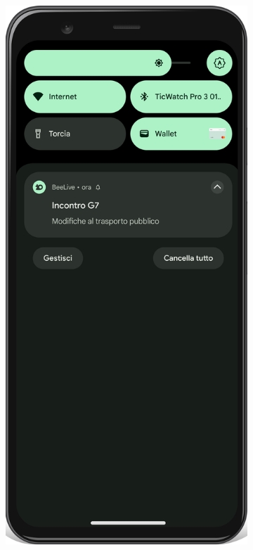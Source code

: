 \documentclass{article}
\begin{document}
\begin{figure}[h]
    \centering
    \begin{subfigure}[t]{0.35\textwidth}
        \centering
        \includegraphics[width=\linewidth]{Images/Mockup3 - Mobile.png}

\end{subfigure}
\end{figure}
\end{document}
